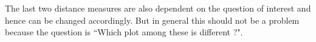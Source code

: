 \documentclass[12]{article}
\newcommand{\red}[1]{{\color{red} #1}}
\newcommand{\green}[1]{{\color{cyan} #1}}
\begin{document}
The last two distance measures are also dependent on the question of interest and hence can be changed accordingly. But in general this should not be a problem because the question is ``Which plot among these is different ?". 
%
%
%
%
\end{document}

